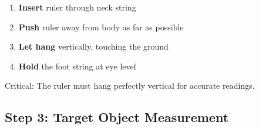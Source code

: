 \documentclass[11pt,a4paper]{article}
\begin{document}
\begin{multicols}{2}
    \columnbreak
    
    \begin{enumerate}[noitemsep]
        \item \textbf{Insert} ruler through neck string
        \item \textbf{Push} ruler away from body as far as possible
        \item \textbf{Let hang} vertically, touching the ground
        \item \textbf{Hold} the foot string at eye level
    \end{enumerate}
    
    Critical: The ruler must hang perfectly vertical for accurate readings.
\end{multicols}
\newpage

\subsection{Step 3: Target Object Measurement}
\end{document}
